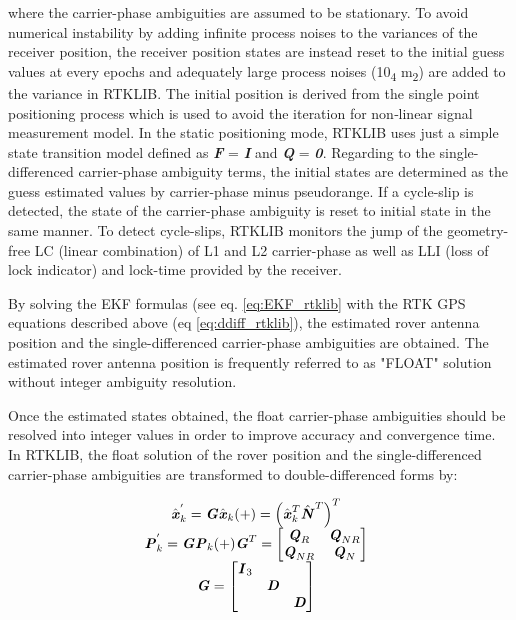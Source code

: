 where the carrier-phase ambiguities are assumed to be stationary. To avoid numerical instability by adding infinite process noises to the variances of the receiver position, the receiver position states are instead reset to the initial guess values at every epochs and adequately large process noises (10\textsubscript{4} m\textsubscript{2}) are added to the variance in RTKLIB. The initial position is derived from
the single point positioning process which is used to avoid the iteration for non‐linear signal
measurement model. In the static positioning mode, RTKLIB uses just a
simple state transition model defined as \textbf{\textit{F}} = \textbf{\textit{I}} and \textbf{\textit{Q}} = \textbf{\textit{0}}. Regarding to
the single-differenced carrier-phase ambiguity terms, the initial
states are determined as the guess estimated values by
carrier-phase minus pseudorange. If a cycle-slip is detected, the
state of the carrier-phase ambiguity is reset to initial state in the
same manner. To detect cycle-slips, RTKLIB monitors the jump
of the geometry-free LC (linear combination) of L1 and L2
carrier-phase as well as LLI (loss of lock indicator) and lock-time
provided by the receiver.

By solving the EKF formulas (see eq. \ref{eq:EKF_rtklib} with the RTK GPS equations
described above (eq \ref{eq:ddiff_rtklib}), the estimated rover antenna position and the
single-differenced carrier-phase ambiguities are obtained. The
estimated rover antenna position is frequently referred to as
"FLOAT" solution without integer ambiguity resolution.

Once the estimated states obtained, the float carrier-phase
ambiguities should be resolved into integer values in order to
improve accuracy and convergence time. In RTKLIB, the float
solution of the rover position and the single-differenced
carrier-phase ambiguities are transformed to double-differenced
forms by:

\begin{equation}
    \begin{matrix}
        \hat{\textbf{\textit{x}}}_{k}^{'}= \textbf{\textit{G}}  \hat{\textbf{\textit{x}}}_{k} (+) = \left({\hat{\textbf{\textit{x}}}_{k}}^{T} {\hat{\textbf{\textit{N}}}}^{T}\right)^{T}
        \\

    \textbf{\textit{P}}_{k}^{'}=\textbf{\textit{G}} \textbf{\textit{P}}_{k}(+) \textbf{\textit{G}}^{T}= \begin{bmatrix}
    \textbf{\textit{Q}}_{R} & \textbf{\textit{Q}}_{NR}\\
    \textbf{\textit{Q}}_{NR} & \textbf{\textit{Q}}_{N}\\
    \end{bmatrix}
\\
\textbf{\textit{G}}=\begin{bmatrix}
\textbf{\textit{I}}_{3}&&\\
&\textbf{\textit{D}}&\\
&&\textbf{\textit{D}}\\
\end{bmatrix}
\end{matrix}
\\
\label{eq:rtklib_cp_ddidd}
\end{equation}

